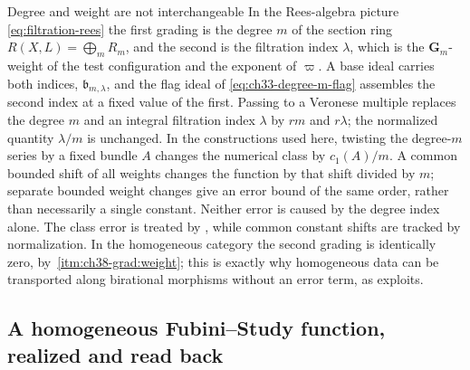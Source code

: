 \begin{warning}{Degree and weight are not interchangeable}
\label{warn:ch38-two-gradings}
In the Rees-algebra picture \eqref{eq:filtration-rees} the first grading is
the degree $m$ of the section ring $R(X,L)=\bigoplus_mR_m$, and the
second is the filtration index $\lambda$, which is the
$\mathbf G_m$-weight of the test configuration and the exponent of
$\varpi$.  A base ideal carries both indices,
$\mathfrak b_{m,\lambda}$, and the flag ideal of
\eqref{eq:ch33-degree-m-flag} assembles the second index at a fixed value
of the first.  Passing to a Veronese multiple replaces the degree $m$ and an
integral filtration index $\lambda$ by $rm$ and $r\lambda$;
the normalized quantity $\lambda/m$ is unchanged. In the
constructions used here, twisting the degree-$m$ series by a fixed
bundle $A$ changes the numerical class by $c_1(A)/m$.
A common bounded shift of all weights changes the function by
that shift divided by $m$; separate bounded weight changes give
an error bound of the same order, rather than necessarily a single
constant. Neither error is caused by the degree index alone.
The class error is treated by , while
common constant shifts are tracked by normalization.
In the homogeneous category the second
grading is identically zero, by
\,\cref{itm:ch38-grad:weight}; this is exactly
why homogeneous data can be transported along birational morphisms without
an error term, as  exploits.
\end{warning}

\subsection{A homogeneous Fubini--Study function, realized and read back}
\label{sec:ch38-fs-example}

